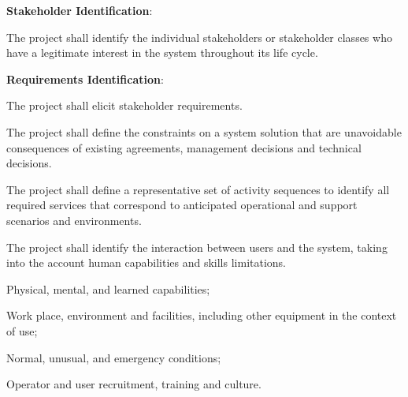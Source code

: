 			\begin{adjustwidth}{2em}{0pt} 

				\begin{compactenum}

					\item {\bf Stakeholder Identification}:
					\begin{compactenum}

						\item The project shall identify the individual stakeholders or stakeholder classes who have a legitimate interest in the system throughout its life cycle.

					\end{compactenum}

					\item {\bf Requirements Identification}:
					\begin{compactenum}

						\item The project shall elicit stakeholder requirements.

						\item The project shall define the constraints on a system solution that are unavoidable consequences of existing agreements, management decisions and technical decisions.

						\item The project shall define a representative set of activity sequences to identify all required services that correspond to anticipated operational and support scenarios and environments.

						\item The project shall identify the interaction between users and the system, taking into the account human capabilities and skills limitations.

						\begin{compactenum}

							\item Physical, mental, and learned capabilities;

							\item Work place, environment and facilities, including other equipment in the context of use;

							\item Normal, unusual, and emergency conditions;

							\item Operator and user recruitment, training and culture.


\end{compactenum}
\end{compactenum}
\end{compactenum}
\end{adjustwidth}
